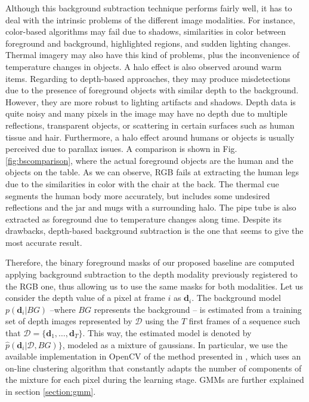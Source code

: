 \documentclass[10pt,twocolumn,letterpaper]{article}
\begin{document}
Although this background subtraction technique performs fairly well, it has to deal with the intrinsic problems of the different image modalities. For instance, color-based algorithms may fail due to shadows, similarities in color between foreground and background, highlighted regions, and sudden lighting changes. Thermal imagery may also have this kind of problems, plus the inconvenience of temperature changes in objects. A halo effect is also observed around warm items. Regarding to depth-based approaches, they may produce misdetections due to the presence of foreground objects with similar depth to the background. However, they are more robust to lighting artifacts and shadows. Depth data is quite noisy and many pixels in the image may have no depth due to multiple reflections, transparent objects, or scattering in certain surfaces such as human tissue and hair. Furthermore, a halo effect around humans or objects is usually perceived due to parallax issues. A comparison is shown in Fig. \ref{fig:bscomparison}, where the actual foreground objects are the human and the objects on the table. As we can observe, RGB fails at extracting the human legs due to the similarities in color with the chair at the back. The thermal cue segments the human body more accurately, but includes some undesired reflections and the jar and mugs with a surrounding halo. The pipe tube is also extracted as foreground due to temperature changes along time. Despite its drawbacks, depth-based background subtraction is the one that seems to give the most accurate result. 

Therefore, the binary foreground masks of our proposed baseline are computed applying background subtraction to the depth modality previously registered to the RGB one, thus allowing us to use the same masks for both modalities.  Let us consider the depth value of a pixel at frame $i$ as $\mathbf{d}_i$. The background model $p(\mathbf{d}_i|BG)$ --where $BG$ represents the background -- is estimated from a training set of depth images represented by $\mathcal{D}$ using the $T$ first frames of a sequence such that $\mathcal{D} = \{\mathbf{d}_1, \ldots, \mathbf{d}_T\}$. This way, the estimated model is denoted by $\hat{p}(\mathbf{d}_i| \mathcal{D}, BG)\}$, modeled as a mixture of gaussians. In particular, we use the available implementation in OpenCV of the method presented in \cite{zivkovic2004improved}, which uses an on-line clustering algorithm that constantly adapts the number of components of the mixture for each pixel during the learning stage. GMMs are further explained in section \ref{section:gmm}.
\end{document}
